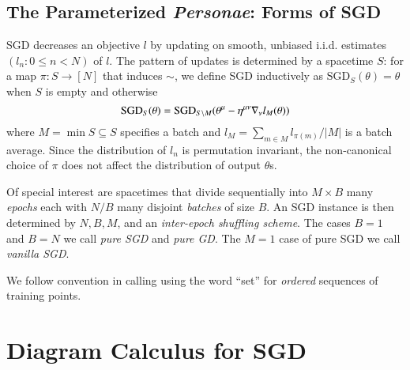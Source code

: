 \documentclass{article}
\newcommand{\SGD}{\text{\textnormal{SGD}}}
\newcommand{\wabs}[1]{\left|#1\right|}
\begin{document}
    \subsection{The Parameterized \emph{Personae}: Forms of SGD}
        SGD decreases an objective $l$ by updating on smooth, unbiased i.i.d.
        estimates $(l_n: 0\leq n<N)$ of $l$.  The pattern of updates is
        determined by a spacetime $S$: for a map
        $\pi:S\to [N]$ that induces $\sim$, we define SGD inductively as
        $\text{SGD}_{S}(\theta) = \theta$ when $S$ is empty and otherwise
        $$
            \SGD_S(\theta) =
                \SGD_{S\setminus M}(\theta^\mu - \eta^{\mu\nu} \nabla_\nu l_{M}(\theta))
        $$
        where $M = \min S \subseteq S$ specifies a batch and $l_M = \sum_{m\in
        M} l_{\pi(m)} / \wabs{M}$ is a batch average.  Since the distribution
        of $l_n$ is permutation invariant, the non-canonical choice of $\pi$
        does not affect the distribution of output $\theta$s.
    
        Of special interest are spacetimes that divide sequentially into
        $M\times B$ many \emph{epochs} each with $N/B$ many disjoint
        \emph{batches} of size $B$.  An SGD instance is then determined by $N,
        B, M$, and an \emph{inter-epoch shuffling scheme}.  The cases $B=1$ and
        $B=N$ we call \emph{pure SGD} and \emph{pure GD}.  The $M=1$ case of
        pure SGD we call \emph{vanilla SGD}.

        We follow convention in calling using the word ``set'' for
        \emph{ordered} sequences of training points. 


\section{Diagram Calculus for SGD}

\end{document}
